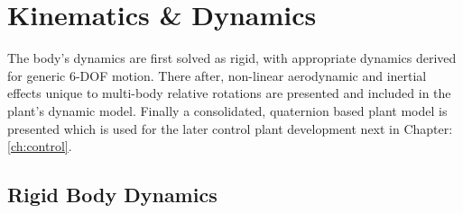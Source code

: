 \chapter{Kinematics \& Dynamics}
\label{ch:dynamics}
The body's dynamics are first solved as rigid, with appropriate dynamics derived for generic 6-DOF motion. There after, non-linear aerodynamic and inertial effects unique to multi-body relative rotations are presented and included in the plant's dynamic model. Finally a consolidated, quaternion based plant model is presented which is used for the later control plant development next in Chapter:\ref{ch:control}.
\section{Rigid Body Dynamics}
\label{sec:dynamics.rigidbody}
